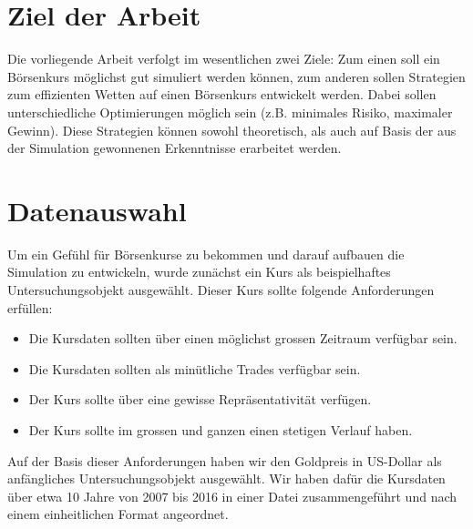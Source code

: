 \documentclass[11pt]{scrartcl}
\begin{document}
	\section{Ziel der Arbeit}
		Die vorliegende Arbeit verfolgt im wesentlichen zwei Ziele: Zum einen soll ein B\"orsenkurs m\"oglichst gut simuliert werden k\"onnen, zum anderen sollen Strategien zum effizienten Wetten auf einen B\"orsenkurs entwickelt werden. Dabei sollen unterschiedliche Optimierungen m\"oglich sein (z.B. minimales Risiko, maximaler Gewinn). Diese Strategien k\"onnen sowohl theoretisch, als auch auf Basis der aus der Simulation gewonnenen Erkenntnisse erarbeitet werden.
	\section{Datenauswahl}
		Um ein Gef\"uhl f\"ur B\"orsenkurse zu bekommen und darauf aufbauen die Simulation zu entwickeln, wurde zun\"achst ein Kurs als beispielhaftes Untersuchungsobjekt ausgew\"ahlt.
		Dieser Kurs sollte folgende Anforderungen erf\"ullen:
		\begin{itemize}
			\item Die Kursdaten sollten \"uber einen m\"oglichst grossen Zeitraum verf\"ugbar sein.
			\item Die Kursdaten sollten als min\"utliche Trades verf\"ugbar sein.
			\item Der Kurs sollte \"uber eine gewisse Repr\"asentativit\"at verf\"ugen.
			\item Der Kurs sollte im grossen und ganzen einen stetigen Verlauf haben.
		\end{itemize}
		Auf der Basis dieser Anforderungen haben wir den Goldpreis in US-Dollar als anf\"angliches Untersuchungsobjekt ausgew\"ahlt. Wir haben daf\"ur die Kursdaten \"uber etwa 10 Jahre von 2007 bis 2016 in einer Datei zusammengef\"uhrt und nach einem einheitlichen Format angeordnet.
\end{document}
